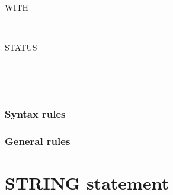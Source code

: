 
\begin{syntax}
   
  \begin{0-1}
    \begin{1=}
       \\
    \end{1=}
    \begin{1=}
      \identifier \\
      \literal
    \end{1=} \\

    WITH
    \begin{1=}
       \\
    \end{1=}
    STATUS
    \begin{0-1}
      \identifier \\
      \literal
    \end{0-1}
  \end{0-1}
\end{syntax}


\begin{syntax}[\deletedcolour]
   \literal
\end{syntax}


\begin{syntax}[\miscextcolour]
   
  \begin{1=}
    \identifier \\
    \literal
  \end{1=}
\end{syntax}

\subsubsection{Syntax rules}

\subsubsection{General rules}

\section{STRING statement}

